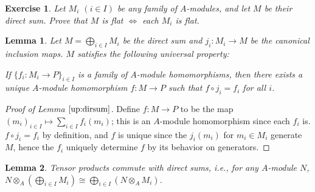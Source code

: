 \documentclass[12pt,letterpaper]{article}
\newtheorem{problem}{Exercise}[section]
\newtheorem{lemma}{Lemma}%
\theoremstyle{definition}
\theoremstyle{remark}
\numberwithin{figure}{problem}
\numberwithin{equation}{section}
\begin{document}
\begin{problem}\label{exc:2.4}
  Let
  $M_i$ $(i \in
  I)$ be any family of
  $A$-modules, and let
  $M$ be their direct sum.
  Prove that
  $M$ is flat
  $\Leftrightarrow$ each
  $M_i$ is flat.
\end{problem}
\begin{lemma}\label{up:dirsum}
  Let
  $M = \bigoplus_{i \in I}
  M_i$ be the direct sum and
  $j_i\colon M_i \to
  M$ be the canonical inclusion maps.
  $M$ satisfies the following universal property: \par If
  $\{f_i \colon M_i \to P\}_{i \in
    I}$ is a family of
  $A$-module homomorphisms, then there exists a unique
  $A$-module homomorphism
  $f\colon M \to
  P$ such that
  $f \circ j_i =
  f_i$ for all
  $i$.
\end{lemma}
\begin{proof}[Proof of Lemma
  $\ref{up:dirsum}$]
  Define
  $f \colon M \to
  P$ to be the map
  $(m_i)_{i \in I} \mapsto \sum_{i \in I}
  f_i(m_i)$; this is an
  $A$-module homomorphism since each
  $f_i$ is.
  $f \circ j_i =
  f_i$ by definition, and
  $f$ is unique since the
  $j_i(m_i)$ for
  $m_i \in
  M_i$ generate
  $M$, hence the
  $f_i$ uniquely determine
  $f$ by its behavior on generators.
\end{proof}
\begin{lemma}\label{l2.4}
  Tensor products commute with direct sums, i.e., for any
  $A$-module
  $N$,
  $N \otimes_A \left(\bigoplus_{i \in I} M_i\right) \cong \bigoplus_{i \in I}(N \otimes_A
  M_i)$.
\end{lemma}
\end{document}
